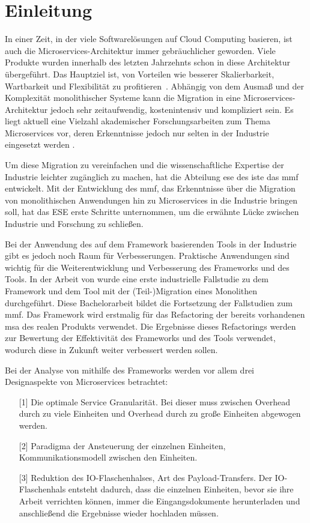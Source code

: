 \chapter{Einleitung}
\label{chap:einleitung}

In einer Zeit, in der viele Softwarelösungen auf Cloud Computing basieren, ist auch die Mi\-cro\-services-Architektur immer gebräuchlicher geworden.
Viele Produkte wurden innerhalb des letzten Jahrzehnts schon in diese Architektur übergeführt.
Das Hauptziel ist, von Vorteilen wie besserer Skalierbarkeit, Wartbarkeit und Flexibilität zu profitieren~\cite{Fritzsch_2019,taibi2017processmotivations}.
Abhängig von dem Ausmaß und der Komplexität monolithischer Systeme kann die Migration in eine Microservices-Architektur jedoch sehr zeitaufwendig, kostenintensiv und kompliziert sein.
Es liegt aktuell eine Vielzahl akademischer Forschungsarbeiten zum Thema Microservices vor, deren Erkenntnisse jedoch nur selten in der Industrie eingesetzt werden \cite{fritzsch2022architecturecentric}.

Um diese Migration zu vereinfachen und die wissenschaftliche Expertise der Industrie leichter zugänglich zu machen, hat die Abteilung \gls{ese} des \gls{iste} das \gls{mmf} entwickelt.
Mit der Entwicklung des \gls{mmf}, das Erkenntnisse über die Migration von monolithischen Anwendungen hin zu Microservices in die Industrie bringen soll, hat das ESE erste Schritte unternommen, um die erwähnte Lücke zwischen Industrie und Forschung zu schließen.

Bei der Anwendung des auf dem Framework basierenden Tools in der Industrie gibt es jedoch noch Raum für Verbesserungen.
Praktische Anwendungen sind wichtig für die Weiterentwicklung und Verbesserung des Frameworks und des Tools.
In der Arbeit von  wurde eine erste industrielle Fallstudie zu dem Framework und dem Tool mit der (Teil-)Migration eines Monolithen durchgeführt.
Diese Bachelorarbeit bildet die Fortsetzung der Fallstudien zum \gls{mmf}.
Das Framework wird erstmalig für das Refactoring der bereits vorhandenen \gls{msa} des realen Produkts \jf verwendet.
Die Ergebnisse dieses Refactorings werden zur Bewertung der Effektivität des Frameworks und des Tools verwendet, wodurch diese in Zukunft weiter verbessert werden sollen.

Bei der Analyse von \jf mithilfe des Frameworks werden vor allem drei Designaspekte von Microservices betrachtet:
\begin{enumerate}
	\item[{[1]}] Die optimale Service Granularität. Bei dieser muss zwischen Overhead durch zu viele Einheiten und Overhead durch zu große Einheiten abgewogen werden.
	\item[{[2]}] Paradigma der Ansteuerung der einzelnen Einheiten, Kommunikationsmodell zwischen den Einheiten.
	\item[{[3]}] Reduktion des IO-Flaschenhalses, Art des Payload-Transfers. %
	Der IO-Flaschenhals entsteht dadurch, dass die einzelnen Einheiten, bevor sie ihre Arbeit verrichten können, immer die Eingangsdokumente herunterladen und anschließend die Ergebnisse wieder hochladen müssen.
\end{enumerate}

